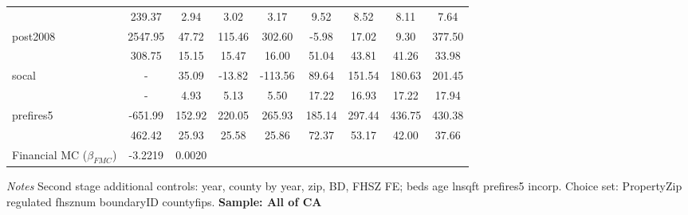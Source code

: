\begin{table}
{\begin{tabular}{lcccccccc}
 & 239.37 & 2.94 & 3.02 & 3.17 & 9.52 & 8.52 & 8.11 & 7.64 \\                                           
post2008 & 2547.95 & 47.72 & 115.46 & 302.60 & -5.98 & 17.02 & 9.30 & 377.50 \\                         
 & 308.75 & 15.15 & 15.47 & 16.00 & 51.04 & 43.81 & 41.26 & 33.98 \\                                    
socal & - & 35.09 & -13.82 & -113.56 & 89.64 & 151.54 & 180.63 & 201.45 \\                              
 & - & 4.93 & 5.13 & 5.50 & 17.22 & 16.93 & 17.22 & 17.94 \\                                            
prefires5 & -651.99 & 152.92 & 220.05 & 265.93 & 185.14 & 297.44 & 436.75 & 430.38 \\                   
 & 462.42 & 25.93 & 25.58 & 25.86 & 72.37 & 53.17 & 42.00 & 37.66 \\                                    
Financial MC ($\beta_{FMC}$) & -3.2219 & 0.0020 \\\hline
\end{tabular} 
}
\scriptsize
\parbox{\textwidth}{\emph{Notes} Second stage additional controls: year, county by year, zip, BD, FHSZ FE; beds age lnsqft prefires5 incorp. Choice set: PropertyZip regulated fhsznum boundaryID  countyfips. \bf{Sample: All of CA}}
\end{table}